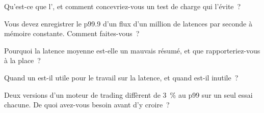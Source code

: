 \begin{interviewq}\label{iq:ll:measuring-latency:2}
Qu'est-ce que l', et comment concevriez-vous un test de charge qui l'évite~?
\end{interviewq}

\begin{interviewq}\label{iq:ll:measuring-latency:3}
Vous devez enregistrer le p99.9 d'un flux d'un million de latences par seconde à mémoire constante. Comment faites-vous~?
\end{interviewq}

\begin{interviewq}\label{iq:ll:measuring-latency:4}
Pourquoi la latence moyenne est-elle un mauvais résumé, et que rapporteriez-vous à la place~?
\end{interviewq}

\begin{interviewq}\label{iq:ll:measuring-latency:5}
Quand un  est-il utile pour le travail sur la latence, et quand est-il inutile~?
\end{interviewq}

\begin{interviewq}\label{iq:ll:measuring-latency:6}
Deux versions d'un moteur de trading diffèrent de 3~\% au p99 sur un seul essai chacune. De quoi avez-vous besoin avant d'y croire~?
\end{interviewq}
